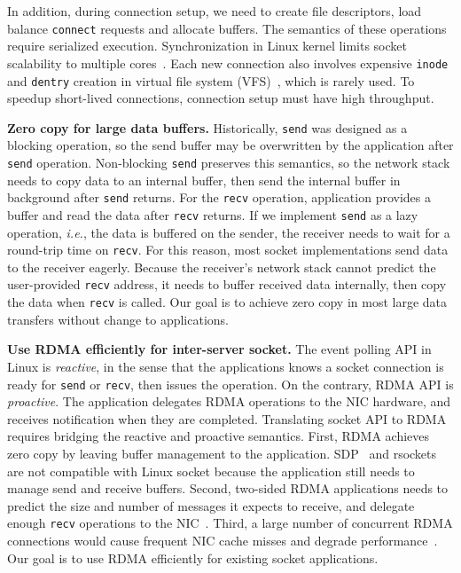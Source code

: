In addition, during connection setup, we need to create file descriptors, load balance \texttt{connect} requests and allocate buffers. The semantics of these operations require serialized execution. Synchronization in Linux kernel limits socket scalability to multiple cores~\cite{lin2016scalable,han2012megapipe}. Each new connection also involves expensive \texttt{inode} and \texttt{dentry} creation in virtual file system (VFS)~\cite{boyd2010analysis}, which is rarely used. To speedup short-lived connections, connection setup must have high throughput.



\textbf{Zero copy for large data buffers.}
Historically, \texttt{send} was designed as a blocking operation, so the send buffer may be overwritten by the application after \texttt{send} operation.
Non-blocking \texttt{send} preserves this semantics, so the network stack needs to copy data to an internal buffer, then send the internal buffer in background after \texttt{send} returns.
For the \texttt{recv} operation, application provides a buffer and read the data after \texttt{recv} returns.
If we implement \texttt{send} as a lazy operation, \textit{i.e.}, the data is buffered on the sender, the receiver needs to wait for a round-trip time on \texttt{recv}.
For this reason, most socket implementations send data to the receiver eagerly. Because the receiver's network stack cannot predict the user-provided \texttt{recv} address, it needs to buffer received data internally, then copy the data when \texttt{recv} is called.
Our goal is to achieve zero copy in most large data transfers without change to applications.

\textbf{Use RDMA efficiently for inter-server socket.}
The event polling API in Linux is \textit{reactive}, in the sense that the applications knows a socket connection is ready for \texttt{send} or \texttt{recv}, then issues the operation.
On the contrary, RDMA API is \textit{proactive}. The application delegates RDMA operations to the NIC hardware, and receives notification when they are completed.
Translating socket API to RDMA requires bridging the reactive and proactive semantics.
First, RDMA achieves zero copy by leaving buffer management to the application. SDP~\cite{socketsdirect} and rsockets~\cite{rsockets} are not compatible with Linux socket because the application still needs to manage send and receive buffers.
Second, two-sided RDMA applications needs to predict the size and number of messages it expects to receive, and delegate enough \texttt{recv} operations to the NIC~\cite{huang2017high}.
Third, a large number of concurrent RDMA connections would cause frequent NIC cache misses and degrade performance~\cite{mprdma,kaminsky2016design}.
Our goal is to use RDMA efficiently for existing socket applications.
